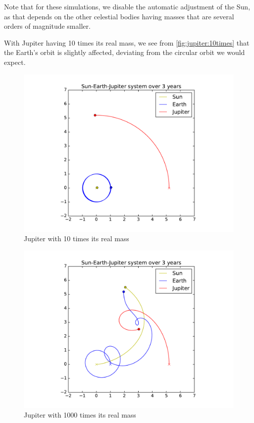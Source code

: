 \documentclass[a4paper]{article}
\begin{document}
Note that for these simulations, we disable the automatic adjustment of the Sun, as that depends on the other celestial bodies having masses that are several orders of magnitude smaller.

With Jupiter having 10 times its real mass, we see from \vref{fig:jupiter:10times} that the Earth's orbit is slightly affected, deviating from the circular orbit we would expect.

\begin{figure}[htb]
\includegraphics[width=\textwidth]{fig/jupitermass_10.pdf}
\caption{Jupiter with 10 times its real mass}
\label{fig:jupiter:10times}
\end{figure}

\begin{figure}[htb]
\includegraphics[width=\textwidth]{fig/jupitermass_1000.pdf}
\caption{Jupiter with 1000 times its real mass}
\label{fig:jupiter:1000times}
\end{figure}
\end{document}
